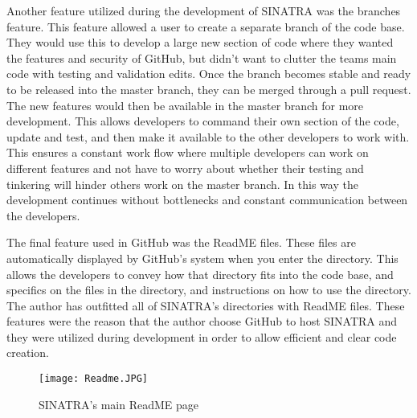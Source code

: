 \indent Another feature utilized during the development of SINATRA was the branches feature. This feature allowed a user to create a separate branch of the code base. They would use this to develop a large new section of code where they wanted the features and security of GitHub, but didn't want to clutter the teams main code with testing and validation edits. Once the branch becomes stable and ready to be released into the master branch, they can be merged through a pull request. The new features would then be available in the master branch for more development. This allows developers to command their own section of the code, update and test, and then make it available to the other developers to work with. This ensures a constant work flow where multiple developers can work on different features and not have to worry about whether their testing and tinkering will hinder others work on the master branch. In this way the development continues without bottlenecks and constant communication between the developers. \par
\indent The final feature used in GitHub was the ReadME files. These files are automatically displayed by GitHub's system when you enter the directory. This allows the developers to convey how that directory fits into the code base, and specifics on the files in the directory, and instructions on how to use the directory. The author has outfitted all of SINATRA's directories with ReadME files. These features were the reason that the author choose GitHub to host SINATRA and they were utilized during development in order to allow efficient and clear code creation. 

\begin{figure}
\texttt{[image: Readme.JPG]}
\centering
\caption{SINATRA's main ReadME page}
\label{fig:readme}
\end{figure}


